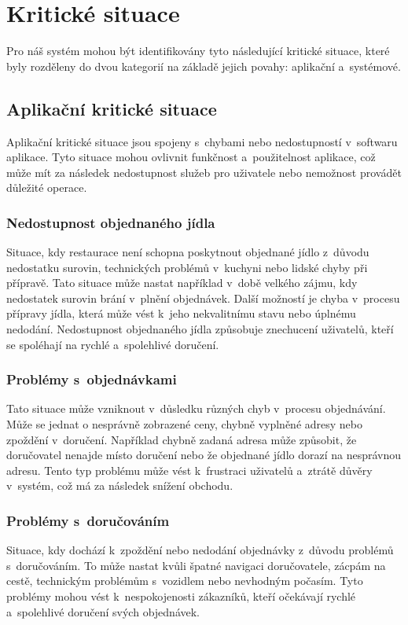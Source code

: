 \section{Kritické situace}

Pro náš systém mohou být identifikovány tyto následující kritické situace, které byly rozděleny do dvou kategorií na základě jejich povahy: aplikační a~systémové.

    \subsection{Aplikační kritické situace}
    
    Aplikační kritické situace jsou spojeny s~chybami nebo nedostupností v~softwaru aplikace. Tyto situace mohou ovlivnit funkčnost a~použitelnost aplikace, což může mít za následek nedostupnost služeb pro uživatele nebo nemožnost provádět důležité operace. 
    
        \subsubsection{Nedostupnost objednaného jídla} 
        Situace, kdy restaurace není schopna poskytnout objednané jídlo z~důvodu nedostatku surovin, technických problémů v~kuchyni nebo lidské chyby při přípravě. Tato situace může nastat například v~době velkého zájmu, kdy nedostatek surovin brání v~plnění objednávek. Další možností je chyba v~procesu přípravy jídla, která může vést k~jeho nekvalitnímu stavu nebo úplnému nedodání. Nedostupnost objednaného jídla způsobuje znechucení uživatelů, kteří se spoléhají na rychlé a~spolehlivé doručení.

        \subsubsection{Problémy s~objednávkami} 
        Tato situace může vzniknout v~důsledku různých chyb v~procesu objednávání. Může se jednat o nesprávně zobrazené ceny, chybně vyplněné adresy nebo zpoždění v~doručení. Například chybně zadaná adresa může způsobit, že doručovatel nenajde místo doručení nebo že objednané jídlo dorazí na nesprávnou adresu. Tento typ problému může vést k~frustraci uživatelů a~ztrátě důvěry v~systém, což má za následek snížení obchodu.

        \subsubsection{Problémy s~doručováním} 
        Situace, kdy dochází k~zpoždění nebo nedodání objednávky z~důvodu problémů s~doručováním. To může nastat kvůli špatné navigaci doručovatele, zácpám na cestě, technickým problémům s~vozidlem nebo nevhodným počasím. Tyto problémy mohou vést k~nespokojenosti zákazníků, kteří očekávají rychlé a~spolehlivé doručení svých objednávek.

